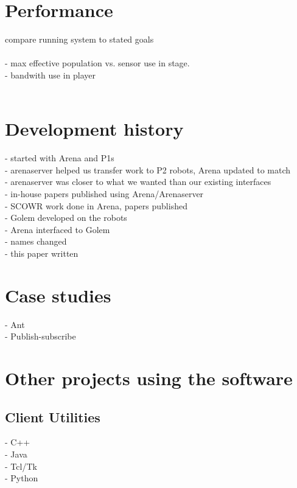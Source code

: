 \documentclass[]{article}
\begin{document}
\section{Performance}

compare running system to stated goals \\
\\
- max effective population vs. sensor use in stage.\\
- bandwith use in player\\
\\
\section{Development history}

- started with Arena and P1s\\
- arenaserver helped us transfer work to P2 robots, Arena updated to match\\
- arenaserver was closer to what we wanted than our existing interfaces\\
- in-house papers published using Arena/Arenaserver\\
- SCOWR work done in Arena, papers published\\
- Golem developed on the robots\\
- Arena interfaced to Golem\\
- names changed\\
- this paper written\\

\section{Case studies}

- Ant\\
- Publish-subscribe\\

\section{Other projects using the software}
\subsection{Client Utilities}
\label{examples:languages}
- C++ \\
- Java \\
- Tcl/Tk \\
- Python \\
\end{document}
